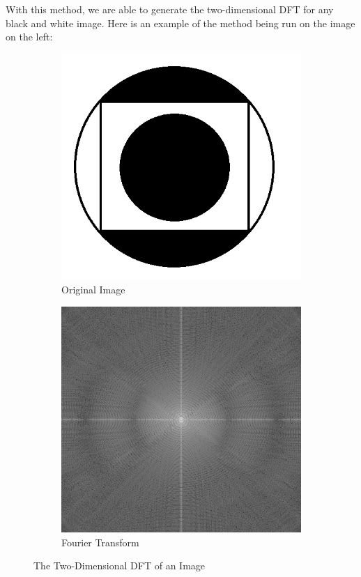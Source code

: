 \documentclass{amsproc}
\begin{document}
With this method, we are able to generate the two-dimensional DFT for any black and white image. Here is an example of the method being run on the image on the left:

\begin{figure}[h]
\centering
\begin{subfigure}{.4\textwidth}
	\centering
	\includegraphics[scale=.3]{images/dftraw1.png}
	\caption{Original Image}
	\label{fig:sub11}
\end{subfigure} \hspace{15mm}
\begin{subfigure}{.4\textwidth}
	\centering
	\includegraphics[scale=.3]{images/2ddft1.png}
	\caption{Fourier Transform}
	\label{fig:sub12}
\end{subfigure}
\caption{The Two-Dimensional DFT of an Image}
\label{fig:im3}
\end{figure}
\end{document}
